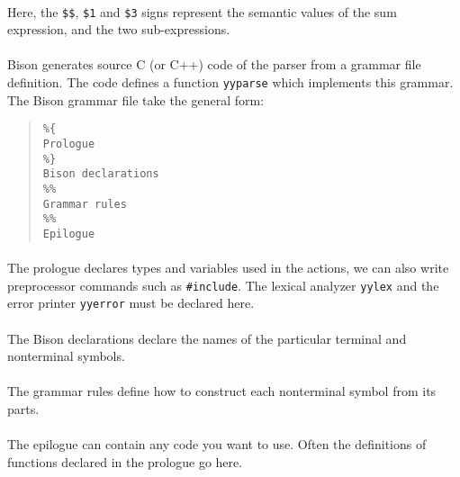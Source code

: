 \paragraph{}
Here, the \texttt {\$\$}, \texttt{\$1} and \texttt{\$3} signs represent the semantic values of the sum expression, and the two sub-expressions.

\paragraph{}
Bison generates source C (or C++) code of the parser from a grammar file definition. The code defines a function \texttt{yyparse} which implements this grammar. The Bison grammar file take the general form:
\begin{quote}
\begin{verbatim}
%{
Prologue
%}
Bison declarations
%%
Grammar rules
%%
Epilogue
\end{verbatim}
\end{quote}

\paragraph{}
The prologue declares types and variables used in the actions, we can also write preprocessor commands such as \texttt{\#include}. The lexical analyzer \texttt{yylex} and the error printer \texttt{yyerror} must be declared here.

\paragraph{}
The Bison declarations declare the names of the particular terminal and nonterminal symbols.

\paragraph{}
The grammar rules define how to construct each nonterminal symbol from its parts.

\paragraph{}
The epilogue can contain any code you want to use. Often the definitions of functions declared in the prologue go here.
